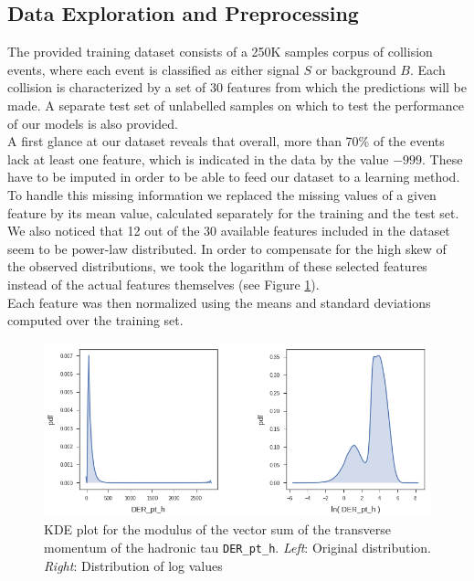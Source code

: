 \documentclass[10pt,conference,compsocconf]{IEEEtran}
\begin{document}
\subsection{Data Exploration and Preprocessing}
The provided training dataset consists of a 250K samples corpus of collision events, where each event is classified as either signal $S$ or background $B$. Each collision is characterized by a set of 30 features from which the predictions will be made. A separate test set of unlabelled samples on which to test the performance of our models is also provided. \\
A first glance at our dataset reveals that overall,
more than 70\% of the events lack at least one feature, which is indicated in the data  by the value $-999$. These have to be imputed in order to be able to feed our dataset to a learning method. To handle this missing information we replaced the missing values of a given feature by its mean value, calculated separately for the training and the test set. \\
We also noticed that 12 out of the 30 available features included in the dataset seem to be power-law distributed. In order to compensate for the high skew of the observed distributions, we took the logarithm of these selected features instead of the actual features themselves (see Figure \ref{fig_kde}).\\ Each feature was then normalized using the means and standard deviations computed over the training set. 

\begin{figure}[htb]
\centering
\includegraphics[width=\linewidth]{kdeplot.png}

\cprotect\caption{KDE plot for the modulus of the vector sum of the transverse momentum of the hadronic tau \verb+DER_pt_h+.
\emph{Left}: Original distribution. \emph{Right}:  Distribution of log values}
\label{fig_kde}
\end{figure}
\end{document}
